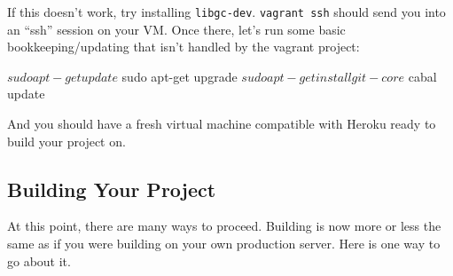 \documentclass[]{article}
\newenvironment{Shaded}{}{}
\newcommand{\ExtensionTok}[1]{#1}
\newcommand{\NormalTok}[1]{#1}
\begin{document}
\begin{enumerate}
\begin{Shaded}
\end{Shaded}

  If this doesn't work, try installing \texttt{libgc-dev}. \texttt{vagrant\ ssh}
  should send you into an ``ssh'' session on your VM. Once there, let's run some
  basic bookkeeping/updating that isn't handled by the vagrant project:

\begin{Shaded}
\begin{Highlighting}[]
\ExtensionTok{$}\NormalTok{ sudo apt{-}get update}
\ExtensionTok{$}\NormalTok{ sudo apt{-}get upgrade}
\ExtensionTok{$}\NormalTok{ sudo apt{-}get install git{-}core}
\ExtensionTok{$}\NormalTok{ cabal update}
\end{Highlighting}
\end{Shaded}
\end{enumerate}

And you should have a fresh virtual machine compatible with Heroku ready to
build your project on.

\subsection{Building Your Project}\label{building-your-project}

At this point, there are many ways to proceed. Building is now more or less the
same as if you were building on your own production server. Here is one way to
go about it.
\end{document}
